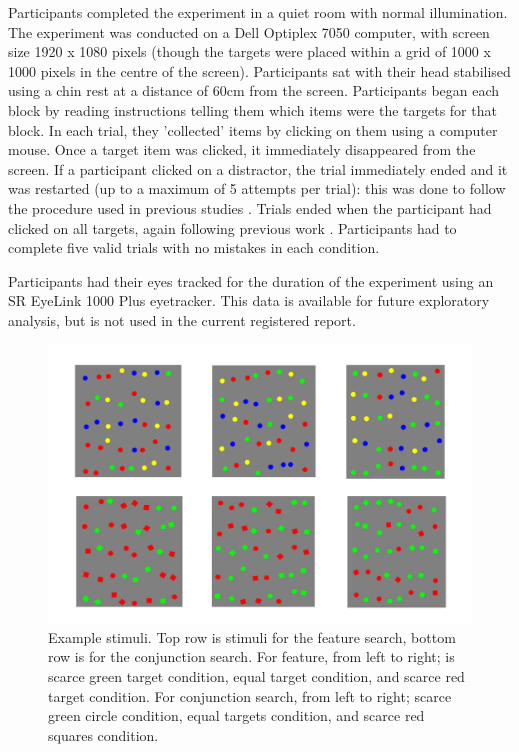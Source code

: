 \documentclass[12pt]{article}
\begin{document}
Participants completed the experiment in a quiet room with normal illumination. The experiment was conducted on a Dell Optiplex 7050 computer, with screen size 1920 x 1080 pixels (though the targets were placed within a grid of 1000 x 1000 pixels in the centre of the screen). Participants sat with their head stabilised using a chin rest at a distance of 60cm from the screen. Participants began each block by reading instructions telling them which items were the targets for that block. In each trial, they 'collected' items by clicking on them using a computer mouse. Once a target item was clicked, it immediately disappeared from the screen. If a participant clicked on a distractor, the trial immediately ended and it was restarted (up to a maximum of 5 attempts per trial): this was done to follow the procedure used in previous studies \citep{kristjansson2014common, clarke2022stable}. Trials ended when the participant had clicked on all targets, again following previous work \citep{kristjansson2014common, clarke2022stable}. Participants had to complete five valid trials with no mistakes in each condition. 

Participants had their eyes tracked for the duration of the experiment using an SR EyeLink 1000 Plus eyetracker. This data is available for future exploratory analysis, but is not used in the current registered report.

\begin{figure}[!h]
\centering
\includegraphics[width=\textwidth]{Example Stimuli.pdf}
\caption{Example stimuli. Top row is stimuli for the feature search, bottom row is for the conjunction search. For feature, from left to right; is scarce green target condition, equal target condition, and scarce red target condition. For conjunction search, from left to right; scarce green circle condition, equal targets condition, and scarce red squares condition.}
\label{fig_exstim}
\end{figure}
\end{document}
